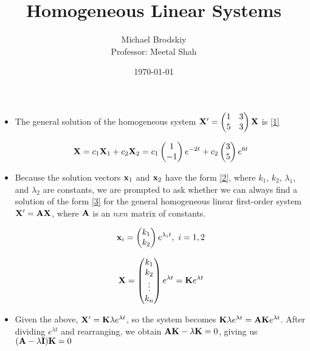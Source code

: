 \documentclass[12pt]{article}
\title{Homogeneous Linear Systems}
\date{\today}
\author{Michael Brodskiy\\ \small Professor: Meetal Shah}
\begin{document}
\maketitle

\begin{itemize}

  \item The general solution of the homogeneous system $\bold{X}'=\begin{pmatrix}1 & 3\\ 5 & 3\\ \end{pmatrix}\bold{X}$ is \eqref{1}

    \begin{equation}
      \bold{X}=c_1\bold{X}_1+c_2\bold{X}_2=c_1\begin{pmatrix} 1 \\ -1 \end{pmatrix}e^{-2t}+c_2\begin{pmatrix} 3 \\ 5\end{pmatrix}e^{6t}
      \label{1}
    \end{equation}

  \item Because the solution vectors $\bold{x}_1$ and $\bold{x}_2$ have the form \eqref{2}, where $k_1$, $k_2$, $\lambda_1$, and $\lambda_2$ are constants, we are prompted to ask whether we can always find a solution of the form \eqref{3} for the general homogeneous linear first-order system $\bold{X}'=\bold{AX}$, where $\bold{A}$ is an $nxn$ matrix of constants.

    \begin{equation}
      \bold{x}_i=\begin{pmatrix} k_1 \\ k_2 \end{pmatrix}e^{\lambda_it},\,\,i=1,2
      \label{2}
    \end{equation}

    \begin{equation}
      \bold{X}=\begin{pmatrix}k_1\\k_2\\\vdots\\k_n\end{pmatrix}e^{\lambda t}=\bold{K}e^{\lambda t}
      \label{3}
    \end{equation}

  \item Given the above, $\bold{X}'=\bold{K}\lambda e^{\lambda t}$, so the system becomes $\bold{K}\lambda e^{\lambda t}=\bold{AK}e^{\lambda t}$. After dividing $e^{\lambda t}$ and rearranging, we obtain $\bold{AK}-\lambda\bold{K}=0$, giving us $(\bold{A}-\lambda\bold{I})\bold{K}=0$


\end{itemize}
\end{document}
